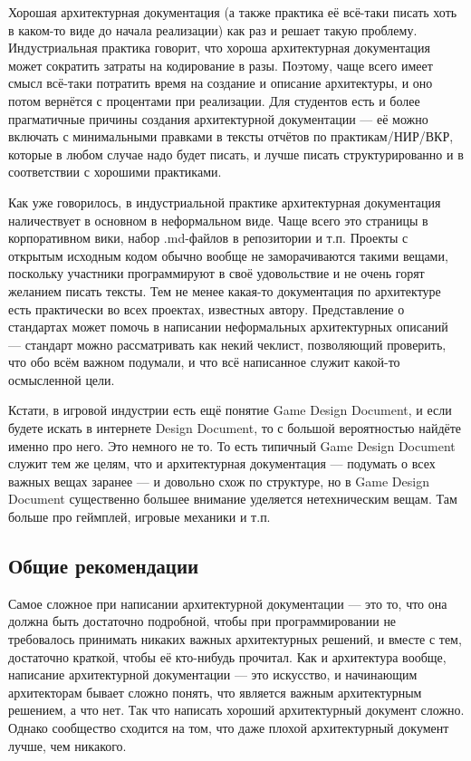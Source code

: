 \documentclass[a5paper]{article}
\begin{document}
Хорошая архитектурная документация (а также практика её всё-таки писать хоть в каком-то виде до начала реализации) как раз и решает такую проблему. Индустриальная практика говорит, что хороша архитектурная документация может сократить затраты на кодирование в разы. Поэтому, чаще всего имеет смысл всё-таки потратить время на создание и описание архитектуры, и оно потом вернётся с процентами при реализации. Для студентов есть и более прагматичные причины создания архитектурной документации --- её можно включать с минимальными правками в тексты отчётов по практикам/НИР/ВКР, которые в любом случае надо будет писать, и лучше писать структурированно и в соответствии с хорошими практиками.

Как уже говорилось, в индустриальной практике архитектурная документация наличествует в основном в неформальном виде. Чаще всего это страницы в корпоративном вики, набор .md-файлов в репозитории и т.п. Проекты с открытым исходным кодом обычно вообще не заморачиваются такими вещами, поскольку участники программируют в своё удовольствие и не очень горят желанием писать тексты. Тем не менее какая-то документация по архитектуре есть практически во всех проектах, известных автору. Представление о стандартах может помочь в написании неформальных архитектурных описаний --- стандарт можно рассматривать как некий чеклист, позволяющий проверить, что обо всём важном подумали, и что всё написанное служит какой-то осмысленной цели. 

Кстати, в игровой индустрии есть ещё понятие Game Design Document, и если будете искать в интернете Design Document, то с большой вероятностью найдёте именно про него. Это немного не то. То есть типичный Game Design Document служит тем же целям, что и архитектурная документация --- подумать о всех важных вещах заранее --- и довольно схож по структуре, но в Game Design Document существенно большее внимание уделяется нетехническим вещам. Там больше про геймплей, игровые механики и т.п.

\subsection{Общие рекомендации}

Самое сложное при написании архитектурной документации --- это то, что она должна быть достаточно подробной, чтобы при программировании не требовалось принимать никаких важных архитектурных решений, и вместе с тем, достаточно краткой, чтобы её кто-нибудь прочитал. Как и архитектура вообще, написание архитектурной документации --- это искусство, и начинающим архитекторам бывает сложно понять, что является важным архитектурным решением, а что нет. Так что написать хороший архитектурный документ сложно. Однако сообщество сходится на том, что даже плохой архитектурный документ лучше, чем никакого.
\end{document}
